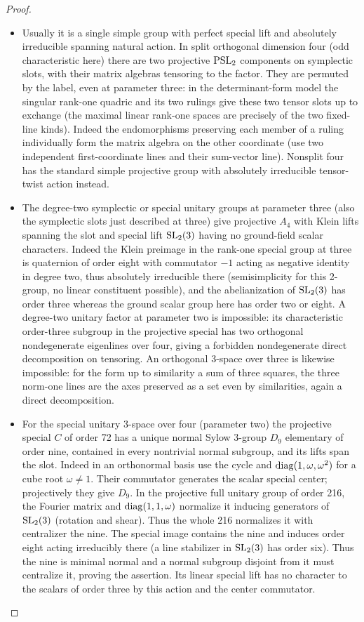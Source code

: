\begin{proof}
\begin{itemize}
\item Usually it is a single simple group with perfect special lift and absolutely irreducible spanning natural action. In split orthogonal dimension four (odd characteristic here) there are two projective \({\rm PSL}_2\) components on symplectic slots, with their matrix algebras tensoring to the factor. They are permuted by the label, even at parameter three: in the determinant-form model the singular rank-one quadric and its two rulings give these two tensor slots up to exchange (the maximal linear rank-one spaces are precisely of the two fixed-line kinds). Indeed the endomorphisms preserving each member of a ruling individually form the matrix algebra on the other coordinate (use two independent first-coordinate lines and their sum-vector line). Nonsplit four has the standard simple projective group with absolutely irreducible tensor-twist action instead.
\item The degree-two symplectic or special unitary groups at parameter three (also the symplectic slots just described at three) give projective \(A_4\) with Klein lifts spanning the slot and special lift \({\rm SL}_2(3)\) having no ground-field scalar characters. Indeed the Klein preimage in the rank-one special group at three is quaternion of order eight with commutator \(-1\) acting as negative identity in degree two, thus absolutely irreducible there (semisimplicity for this 2-group, no linear constituent possible), and the abelianization of \({\rm SL}_2(3)\) has order three whereas the ground scalar group here has order two or eight. A degree-two unitary factor at parameter two is impossible: its characteristic order-three subgroup in the projective special has two orthogonal nondegenerate eigenlines over four, giving a forbidden nondegenerate direct decomposition on tensoring. An orthogonal 3-space over three is likewise impossible: for the form up to similarity a sum of three squares, the three norm-one lines are the axes preserved as a set even by similarities, again a direct decomposition.
\item For the special unitary 3-space over four (parameter two) the projective special \(C\) of order 72 has a unique normal Sylow 3-group \(D_9\) elementary of order nine, contained in every nontrivial normal subgroup, and its lifts span the slot. Indeed in an orthonormal basis use the cycle and \({\rm diag}(1,\omega,\omega^2)\) for a cube root \(\omega\ne1\). Their commutator generates the scalar special center; projectively they give \(D_9\). In the projective full unitary group of order 216, the Fourier matrix and \({\rm diag}(1,1,\omega)\) normalize it inducing generators of \({\rm SL}_2(3)\) (rotation and shear). Thus the whole 216 normalizes it with centralizer the nine. The special image contains the nine and induces order eight acting irreducibly there (a line stabilizer in \({\rm SL}_2(3)\) has order six). Thus the nine is minimal normal and a normal subgroup disjoint from it must centralize it, proving the assertion. Its linear special lift has no character to the scalars of order three by this action and the center commutator.
\end{itemize}


\end{proof}
